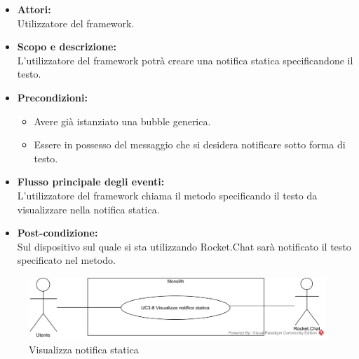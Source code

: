 \begin{itemize}
	\item \textbf{Attori:}
	\\Utilizzatore del framework.
	\item \textbf{Scopo e descrizione:} 
	\\L'utilizzatore del framework potrà creare una notifica statica specificandone il testo.
	\item \textbf{Precondizioni:}
	\begin{itemize}
		\item Avere già istanziato una bubble generica.
		\item Essere in possesso del messaggio che si desidera notificare sotto forma di testo.
	\end{itemize}
	\item \textbf{Flusso principale degli eventi:}
	\\L'utilizzatore del framework chiama il metodo specificando il testo da visualizzare nella notifica statica.
	\item \textbf{Post-condizione:}
	\\Sul dispositivo sul quale si sta utilizzando Rocket.Chat sarà notificato il testo specificato nel metodo.
\end{itemize}

\begin{samepage}
\nopagebreak
\begin{figure}[H]
	\centering
	\includegraphics[width=15cm]{../../documenti/AnalisiDeiRequisiti/Diagrammi_img/usecase/uc1_18.png}
	\caption{\UCFCaption{} Visualizza notifica statica}
\end{figure}
\end{samepage}

